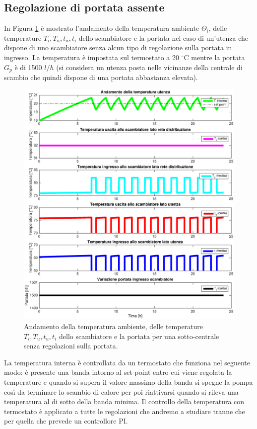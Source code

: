 \documentclass[laurea,oneside,11pt]{USiena_tesiLM3}
\begin{document}
\subsection{Regolazione di portata assente}
In Figura \ref{fig:no_reg} è mostrato l'andamento della temperatura ambiente $\Theta_i$, delle temperature $T_i, T_u, t_u, t_i$ dello scambiatore e la portata nel caso di un'utenza che dispone di uno scambiatore senza alcun tipo di regolazione sulla portata in ingresso. La temperatura è impostata sul termostato a 20 $^{\circ}$C mentre la portata $G_p$ è di 1500 $l/h$ (si considera un utenza posta nelle vicinanze della centrale di scambio che quindi dispone di una portata abbastanza elevata). 

\begin{figure}[!ht]
\centering
\includegraphics[width=\textwidth]{figure/no_reg} 
\caption{Andamento della temperatura ambiente, delle temperature $T_i, T_u, t_u, t_i$  dello scambiatore e la portata per una sotto-centrale senza regolazioni sulla portata.}
\label{fig:no_reg}
\end{figure}

La temperatura interna è controllata da un termostato che funziona nel seguente modo: è presente una banda intorno al set point entro cui viene regolata la temperature e quando si supera il valore massimo della banda si spegne la pompa così da terminare lo scambio di calore per poi riattivarsi quando si rileva una temperatura al di sotto della banda minima. Il controllo della temperatura con termostato è applicato a tutte le regolazioni che andremo a studiare tranne che per quella che prevede un controllore PI. 
\end{document}
